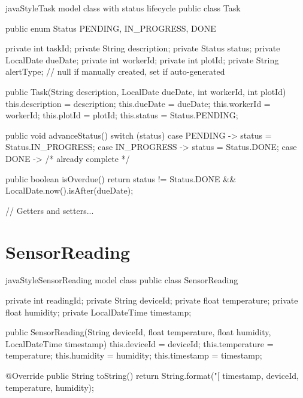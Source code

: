 \documentclass[12pt, a4paper]{report}
\begin{document}
\begin{codeblock}{javaStyle}{Task model class with status lifecycle}
public class Task {
    public enum Status { PENDING, IN_PROGRESS, DONE }

    private int       taskId;
    private String    description;
    private Status    status;
    private LocalDate dueDate;
    private int       workerId;
    private int       plotId;
    private String    alertType; // null if manually created, set if auto-generated

    public Task(String description, LocalDate dueDate, int workerId, int plotId) {
        this.description = description;
        this.dueDate     = dueDate;
        this.workerId    = workerId;
        this.plotId      = plotId;
        this.status      = Status.PENDING;
    }

    public void advanceStatus() {
        switch (status) {
            case PENDING     -> status = Status.IN_PROGRESS;
            case IN_PROGRESS -> status = Status.DONE;
            case DONE        -> { /* already complete */ }
        }
    }

    public boolean isOverdue() {
        return status != Status.DONE && LocalDate.now().isAfter(dueDate);
    }

    // Getters and setters...
}
\end{codeblock}

\section{SensorReading}

\begin{codeblock}{javaStyle}{SensorReading model class}
public class SensorReading {
    private int           readingId;
    private String        deviceId;
    private float         temperature;
    private float         humidity;
    private LocalDateTime timestamp;

    public SensorReading(String deviceId, float temperature,
                         float humidity, LocalDateTime timestamp) {
        this.deviceId    = deviceId;
        this.temperature = temperature;
        this.humidity    = humidity;
        this.timestamp   = timestamp;
    }

    @Override
    public String toString() {
        return String.format("[%
               timestamp, deviceId, temperature, humidity);
    }
}
\end{codeblock}
\end{document}
